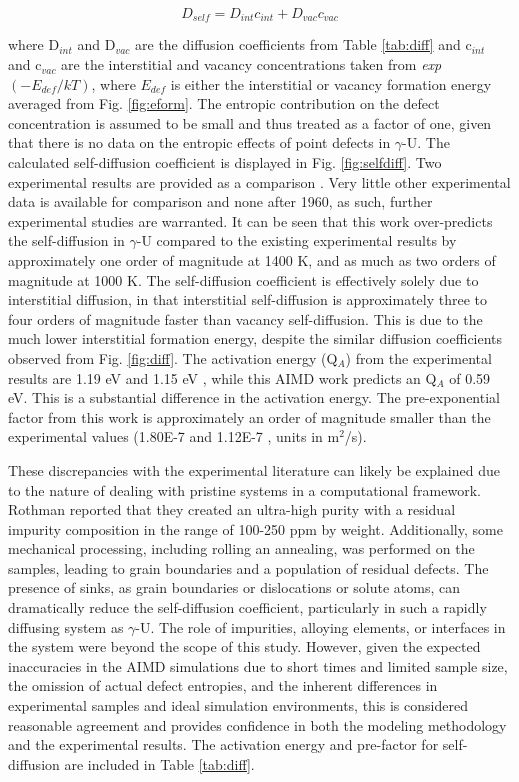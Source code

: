 \documentclass[review]{elsarticle}
\begin{document}
\begin{equation}
\label{eqn:selfd}
D_{self} = D_{int}c_{int} + D_{vac}c_{vac}
\end{equation} 

where D$_{int}$ and D$_{vac}$ are the diffusion coefficients from Table \ref{tab:diff} and c$_{int}$ and c$_{vac}$ are the interstitial and vacancy concentrations taken from \textit{exp}$(-E_{def}/kT)$, where $E_{def}$ is either the interstitial or vacancy formation energy averaged from Fig. \ref{fig:eform}. The entropic contribution on the defect concentration is assumed to be small and thus treated as a factor of one, given that there is no data on the entropic effects of point defects in $\gamma$-U. The calculated self-diffusion coefficient is displayed in Fig. \ref{fig:selfdiff}. Two experimental results are provided as a comparison \cite{rothman1959,adda1959}. Very little other experimental data is available for comparison and none after 1960, as such, further experimental studies are warranted. It can be seen that this work over-predicts the self-diffusion in $\gamma$-U compared to the existing experimental results by approximately one order of magnitude at 1400 K, and as much as two orders of magnitude at 1000 K. The self-diffusion coefficient is effectively solely due to interstitial diffusion, in that interstitial self-diffusion is approximately three to four orders of magnitude faster than vacancy self-diffusion. This is due to the much lower interstitial formation energy, despite the similar diffusion coefficients observed from Fig. \ref{fig:diff}. The activation energy (Q$_A$) from the experimental results are 1.19 eV \cite{adda1959} and 1.15 eV \cite{rothman1959}, while this AIMD work predicts an Q$_A$ of 0.59 eV. This is a substantial difference in the activation energy. The pre-exponential factor from this work is approximately an order of magnitude smaller than the experimental values (1.80E-7 \cite{adda1959} and 1.12E-7 \cite{rothman1959}, units in m$^2$/s). 

These discrepancies with the experimental literature can likely be explained due to the nature of dealing with pristine systems in a computational framework. Rothman \cite{rothman1959} reported that they created an ultra-high purity with a residual impurity composition in the range of 100-250 ppm by weight. Additionally, some mechanical processing, including rolling an annealing, was performed on the samples, leading to grain boundaries and a population of residual defects. The presence of sinks, as grain boundaries or dislocations or solute atoms, can dramatically reduce the self-diffusion coefficient, particularly in such a rapidly diffusing system as $\gamma$-U. The role of impurities, alloying elements, or interfaces in the system were beyond the scope of this study. However, given the expected inaccuracies in the AIMD simulations due to short times and limited sample size, the omission of actual defect entropies, and the inherent differences in experimental samples and ideal simulation environments, this is considered reasonable agreement and provides confidence in both the modeling methodology and the experimental results. The activation energy and pre-factor for self-diffusion are included in Table \ref{tab:diff}. 
\end{document}
